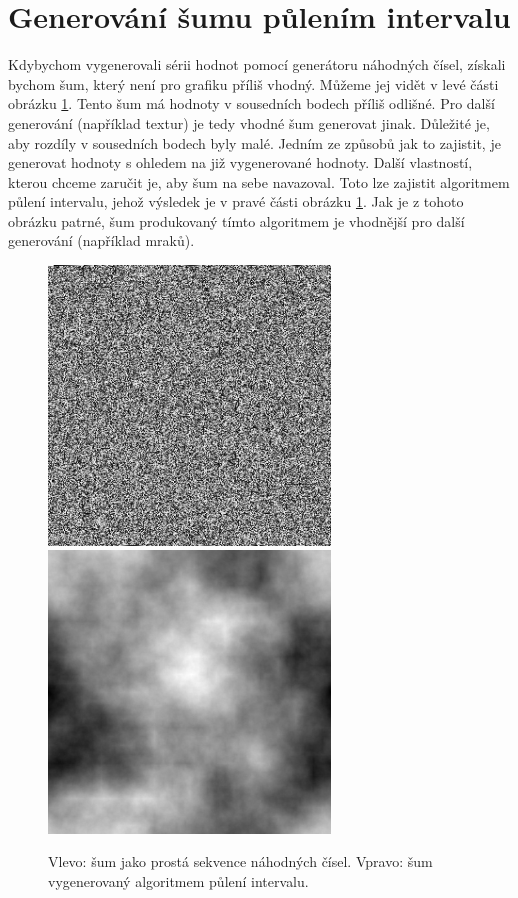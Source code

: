 \section{Generování šumu půlením intervalu}
Kdybychom vygenerovali sérii hodnot pomocí generátoru náhodných čísel, získali bychom šum, který není pro grafiku příliš vhodný.
Můžeme jej vidět v levé části obrázku \ref{fig:sum}.
Tento šum má hodnoty v sousedních bodech příliš odlišné.
Pro další generování (například textur) je tedy vhodné šum generovat jinak.
Důležité je, aby rozdíly v sousedních bodech byly malé.
Jedním ze způsobů jak to zajistit, je generovat hodnoty s ohledem na již vygenerované hodnoty.
Další vlastností, kterou chceme zaručit je, aby šum na sebe navazoval.
Toto lze zajistit algoritmem půlení intervalu, jehož výsledek je v pravé části obrázku \ref{fig:sum}.
Jak je z tohoto obrázku patrné, šum produkovaný tímto algoritmem je vhodnější pro další generování (například mraků).
\begin{figure}[h]
\centering
\includegraphics[width=7.5cm,keepaspectratio]{obr/simply_noise.png}
\includegraphics[width=7.5cm,keepaspectratio]{obr/midpoint_noise.jpg}
\caption{Vlevo: šum jako prostá sekvence náhodných čísel. Vpravo: šum vygenerovaný algoritmem půlení intervalu.}
\label{fig:sum}
\end{figure}

